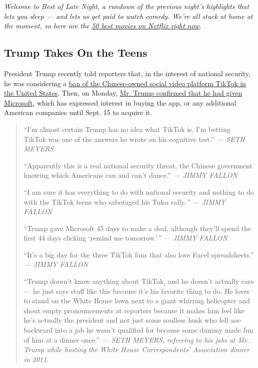 \emph{Welcome to Best of Late Night, a rundown of the previous night's
highlights that lets you sleep --- and lets us get paid to watch comedy.
We're all stuck at home at the moment, so here are the}
\href{https://www.nytimes3xbfgragh.onion/interactive/2020/arts/television/best-movies-on-netflix.html}{\emph{50
best movies on Netflix right now}}\emph{.}

\hypertarget{trump-takes-on-the-teens}{%
\subsection{Trump Takes On the Teens}\label{trump-takes-on-the-teens}}

President Trump recently told reporters that, in the interest of
national security, he was considering a
\href{https://www.nytimes3xbfgragh.onion/2020/08/02/style/tiktok-ban-threat-trump.html}{ban
of the Chinese-owned social video platform TikTok in the United States}.
Then, on Monday,
\href{https://www.nytimes3xbfgragh.onion/2020/08/03/technology/trump-tiktok-microsoft.html}{Mr.
Trump confirmed that he had given Microsoft}, which has expressed
interest in buying the app, or any additional American companies until
Sept. 15 to acquire it.

\begin{quote}
``I'm almost certain Trump has no idea what TikTok is. I'm betting
TikTok was one of the answers he wrote on his cognitive test.''
\emph{--- SETH MEYERS}

``Apparently this is a real national security threat, the Chinese
government knowing which Americans can and can't dance.'' \emph{---
JIMMY FALLON}

``I am sure it has everything to do with national security and nothing
to do with the TikTok teens who sabotaged his Tulsa rally.\emph{'' ---
JIMMY FALLON}

``Trump gave Microsoft 45 days to make a deal, although they'll spend
the first 44 days clicking `remind me tomorrow.'\emph{'' --- JIMMY
FALLON}

``It's a big day for the three TikTok fans that also love Excel
spreadsheets.'' \emph{--- JIMMY FALLON}

``Trump doesn't know anything about TikTok, and he doesn't actually care
--- he just says stuff like this because it's his favorite thing to do.
He loves to stand on the White House lawn next to a giant whirring
helicopter and shout empty pronouncements at reporters because it makes
him feel like he's actually the president and not just some soulless
husk who fell ass-backward into a job he wasn't qualified for because
some dummy made fun of him at a dinner once.'' \emph{--- SETH MEYERS,
referring to his jabs at Mr. Trump while hosting the White House
Correspondents' Association dinner in 2011.}
\end{quote}

